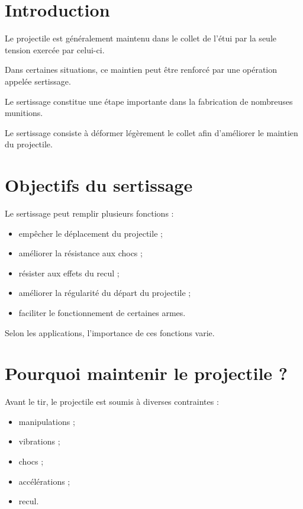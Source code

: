 
\section{Introduction}

Le projectile est généralement maintenu dans le collet de l'étui par la seule
tension exercée par celui-ci.

Dans certaines situations, ce maintien peut être renforcé par une opération
appelée sertissage.

Le sertissage constitue une étape importante dans la fabrication de nombreuses
munitions.

\begin{aretenir}

Le sertissage consiste à déformer légèrement le collet afin d'améliorer le
maintien du projectile.

\end{aretenir}

\section{Objectifs du sertissage}

Le sertissage peut remplir plusieurs fonctions :

\begin{itemize}
    \item empêcher le déplacement du projectile ;
    \item améliorer la résistance aux chocs ;
    \item résister aux effets du recul ;
    \item améliorer la régularité du départ du projectile ;
    \item faciliter le fonctionnement de certaines armes.
\end{itemize}

Selon les applications, l'importance de ces fonctions varie.

\section{Pourquoi maintenir le projectile ?}

Avant le tir, le projectile est soumis à diverses contraintes :

\begin{itemize}
    \item manipulations ;
    \item vibrations ;
    \item chocs ;
    \item accélérations ;
    \item recul.
\end{itemize}

